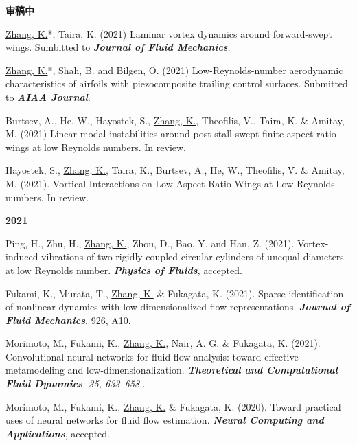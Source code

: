 \documentclass[10pt]{article}
\begin{document}
{\small
\begin{etaremune}

 \item [] {\bf \color{Blue} 审稿中 } 
  \item \underline{Zhang, K.}*, Taira, K. (2021) Laminar vortex dynamics around forward-swept wings. Sumbitted to \textit{\textbf{Journal of Fluid Mechanics}}.
  
  \item \underline{Zhang, K.}*, Shah, B. and Bilgen, O. (2021) Low-Reynolds-number aerodynamic characteristics of airfoils with piezocomposite trailing control surfaces. Submitted to \textit{\textbf{AIAA Journal}}.
  
  \item Burtsev, A., He, W., Hayostek, S., \underline{Zhang, K.}, Theofilis, V., Taira, K. \& Amitay, M. (2021) Linear modal instabilities around post-stall swept finite aspect ratio wings at low Reynolds numbers. In review.
  
  \item Hayostek, S., \underline{Zhang, K.}, Taira, K., Burtsev, A., He, W., Theofilis, V. \& Amitay, M. (2021). Vortical Interactions on Low Aspect Ratio Wings at Low Reynolds numbers. In review.

\item [] {\bf \color{Blue} 2021}

  \item Ping, H., Zhu, H., \underline{Zhang, K.}, Zhou, D., Bao, Y. and Han, Z. (2021). Vortex-induced vibrations of two rigidly coupled circular cylinders of unequal diameters at low Reynolds number. \textit{\textbf{Physics of Fluids}}, accepted. 
  
  \item Fukami, K., Murata, T., \underline{Zhang, K.} \& Fukagata, K. (2021). Sparse identification of nonlinear dynamics with low-dimensionalized flow representations. \textit{\textbf{Journal of Fluid Mechanics}}, 926, A10.
  
  \item Morimoto, M., Fukami, K., \underline{Zhang, K.}, Nair, A. G. \& Fukagata, K. (2021). Convolutional neural networks for fluid flow analysis: toward effective metamodeling and low-dimensionalization. \textit{\textbf{Theoretical and Computational Fluid Dynamics}, 35, 633–658.}.


  \item Morimoto, M., Fukami, K., \underline{Zhang, K.} \& Fukagata, K. (2020). Toward practical uses of neural networks for fluid flow estimation. \textit{\textbf{Neural Computing and Applications}}, accepted.



\end{etaremune}}
\end{document}
